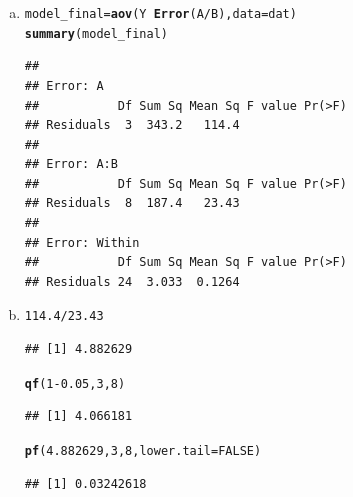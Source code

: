 \documentclass{article}\usepackage[]{graphicx}\usepackage[]{color}
\makeatletter
\newcommand{\hlnum}[1]{\textcolor[rgb]{0.686,0.059,0.569}{#1}}%
\newcommand{\hlopt}[1]{\textcolor[rgb]{0,0,0}{#1}}%
\newcommand{\hlstd}[1]{\textcolor[rgb]{0.345,0.345,0.345}{#1}}%
\newcommand{\hlkwb}[1]{\textcolor[rgb]{0.69,0.353,0.396}{#1}}%
\newcommand{\hlkwc}[1]{\textcolor[rgb]{0.333,0.667,0.333}{#1}}%
\newcommand{\hlkwd}[1]{\textcolor[rgb]{0.737,0.353,0.396}{\textbf{#1}}}%
\newenvironment{kframe}{%
 \def\at@end@of@kframe{}%
 \ifinner\ifhmode%
  \def\at@end@of@kframe{\end{minipage}}%
  \begin{minipage}{\columnwidth}%
 \fi\fi%
 \def\FrameCommand##1{\hskip\@totalleftmargin \hskip-\fboxsep
 \colorbox{shadecolor}{##1}\hskip-\fboxsep
     \hskip-\linewidth \hskip-\@totalleftmargin \hskip\columnwidth}%
 \MakeFramed {\advance\hsize-\width
   \@totalleftmargin\z@ \linewidth\hsize
   \@setminipage}}%
 {\par\unskip\endMakeFramed%
 \at@end@of@kframe}
\newenvironment{knitrout}{}{} %
\makeatother
\begin{document}
\begin{enumerate}[(a)]

\item

\begin{knitrout}
\color{fgcolor}\begin{kframe}
\begin{alltt}
  \hlstd{model_final} \hlkwb{=} \hlkwd{aov}\hlstd{(Y} \hlopt{~} \hlkwd{Error}\hlstd{(A}\hlopt{/}\hlstd{B),} \hlkwc{data} \hlstd{= dat)}
  \hlkwd{summary}\hlstd{(model_final)}
\end{alltt}
\begin{verbatim}
## 
## Error: A
##           Df Sum Sq Mean Sq F value Pr(>F)
## Residuals  3  343.2   114.4               
## 
## Error: A:B
##           Df Sum Sq Mean Sq F value Pr(>F)
## Residuals  8  187.4   23.43               
## 
## Error: Within
##           Df Sum Sq Mean Sq F value Pr(>F)
## Residuals 24  3.033  0.1264
\end{verbatim}
\end{kframe}
\end{knitrout}

\item

\begin{knitrout}
\color{fgcolor}\begin{kframe}
\begin{alltt}
  \hlnum{114.4}\hlopt{/}\hlnum{23.43}
\end{alltt}
\begin{verbatim}
## [1] 4.882629
\end{verbatim}
\begin{alltt}
  \hlkwd{qf}\hlstd{(}\hlnum{1}\hlopt{-}\hlnum{0.05}\hlstd{,} \hlnum{3}\hlstd{,} \hlnum{8}\hlstd{)}
\end{alltt}
\begin{verbatim}
## [1] 4.066181
\end{verbatim}
\begin{alltt}
  \hlkwd{pf}\hlstd{(}\hlnum{4.882629}\hlstd{,} \hlnum{3}\hlstd{,} \hlnum{8}\hlstd{,} \hlkwc{lower.tail} \hlstd{=} \hlnum{FALSE}\hlstd{)}
\end{alltt}
\begin{verbatim}
## [1] 0.03242618
\end{verbatim}
\end{kframe}
\end{knitrout}


\end{enumerate}
\end{document}
